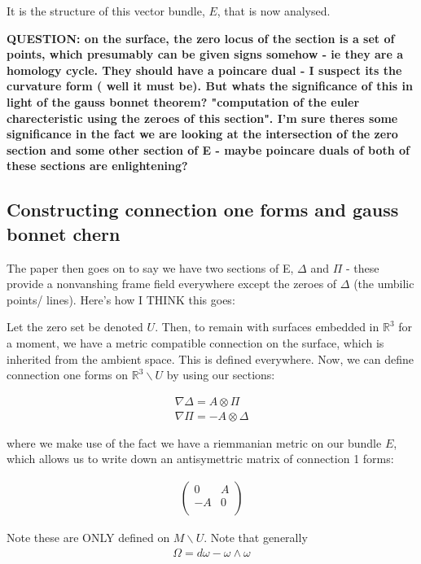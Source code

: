 \documentclass[11pt,onecolumn, a4page]{article}
\numberwithin{equation}{subsection}
\begin{document}
It is the structure of this vector bundle, $E$, that is now analysed.

\textbf {QUESTION: on the surface, the zero locus of the section is a set of points, which presumably can be given signs somehow - ie they are a homology cycle. They should have a poincare dual - I suspect its the curvature form ( well it must be). But whats the significance of this in light of the gauss bonnet theorem? "computation of the euler charecteristic using the zeroes of this section". I'm sure theres some significance in the fact we are looking at the intersection of the zero section and some other section of E - maybe poincare duals of both of these sections are enlightening?}

\subsection{Constructing connection one forms and gauss bonnet chern}

The paper then goes on to say we have two sections of E, $\Delta$ and $\Pi$ - these provide a nonvanshing frame field everywhere except the zeroes of $\Delta$ (the umbilic points/ lines). Here's how I THINK this goes:

Let the zero set be denoted $U$. Then, to remain with surfaces embedded in $\mathbb{R}^3$ for a moment, we have a metric compatible connection on the surface, which is inherited from the ambient space. This is defined everywhere. Now, we can define connection one forms on  $\mathbb{R}^3 \backslash U$ by using our sections:

\begin{eqnarray}
 \nabla \Delta = A \otimes \Pi \\
 \nabla \Pi = -A \otimes \Delta 
\end{eqnarray}

where we make use of the fact we have a riemmanian metric on our bundle $E$, which allows us to write down an antisymettric matrix of connection 1 forms:

\begin{eqnarray}
   \begin{pmatrix} 
 0 & A\\
  -A & 0 \\
 \end{pmatrix}
\end{eqnarray}

Note these are ONLY defined on $M\backslash U$. Note that generally
\begin{eqnarray}
\Omega = d\omega - \omega \wedge \omega
\end{eqnarray}
\end{document}
